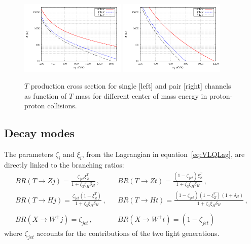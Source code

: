 \begin{figure}[!Hhtbp]
  \begin{center}
    \includegraphics[width=0.45\textwidth]{figs/pheno_prod_single_tp.png}
    \includegraphics[width=0.45\textwidth]{figs/pheno_prod_pair_tp.png}
    \caption{$T$ production cross section for single [left] and pair [right] channels as function of $T$ mass for different center of mass energy in proton-proton collisions.}
    \label{fig:TProdXS}
  \end{center}
\end{figure}

\subsection{Decay modes}
\label{sec:decay}

The parameters $\zeta_{i}$ and $\xi_i$, from the Lagrangian in equation~\ref{eq:VLQLag}, are directly linked to the branching ratios:
 \begin{eqnarray} 
BR (T \to Z j) = \frac{\zeta_{jet} \xi^T_Z}{1+\zeta_3 \xi_H \delta_H}\,, & & BR (T \to Z t) = \frac{(1-\zeta_{jet}) \xi^T_Z}{1+\zeta_3 
\xi_H \delta_H}\,,\\
BR(T \to H j) = \frac{\zeta_{jet} (1-\xi^T_Z)}{1+\zeta_3 \xi_H \delta_H}\,, & &  BR(T \to H t) = \frac{(1-\zeta_{jet})
(1-\xi^T_Z) (1+\delta_H)}{1+\zeta_3 \xi_H \delta_H}\,, \nonumber\\
 & & \nonumber \\
BR(X \to W^+ j) = \zeta_{jet}\,, & & BR(X \to W^+ t) = (1-\zeta_{jet})
 \end{eqnarray} where $\zeta_{jet}$ accounts for the contributions of the two light generations.

